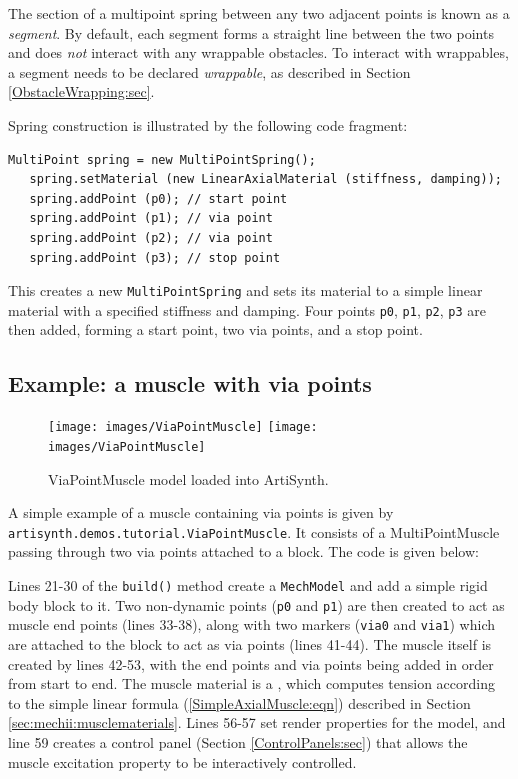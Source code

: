The section of a multipoint spring between any two adjacent points is
known as a {\it segment}. By default, each segment forms a straight
line between the two points and does {\it not} interact with any
wrappable obstacles. To interact with wrappables, a segment needs to
be declared {\it wrappable}, as described in
Section \ref{ObstacleWrapping:sec}.

Spring construction is illustrated by the following code fragment:
%
\begin{lstlisting}[]
   MultiPoint spring = new MultiPointSpring();
   spring.setMaterial (new LinearAxialMaterial (stiffness, damping));
   spring.addPoint (p0); // start point
   spring.addPoint (p1); // via point
   spring.addPoint (p2); // via point
   spring.addPoint (p3); // stop point
\end{lstlisting}
%
This creates a new {\tt MultiPointSpring} and sets its material to a
simple linear material with a specified stiffness and damping.  Four points
{\tt p0}, {\tt p1}, {\tt p2}, {\tt p3} are then added, forming a start
point, two via points, and a stop point.

\subsection{Example: a muscle with via points}
\label{ViaPointMuscle:sec}

\begin{figure}[t]
\begin{center}
\iflatexml
 \texttt{[image: images/ViaPointMuscle]}
\else
 \texttt{[image: images/ViaPointMuscle]}
\fi
\end{center}
\caption{ViaPointMuscle model loaded into ArtiSynth.}
\label{ViaPointMuscle:fig}
\end{figure}

A simple example of a muscle containing via points is given by 
{\tt artisynth.demos.tutorial.ViaPointMuscle}.  It consists
of a MultiPointMuscle passing through two via points attached to a
block. The code is given below:
\lstset{numbers=left}

\lstset{numbers=none}

Lines 21-30 of the {\tt build()} method create a {\tt MechModel} and
add a simple rigid body block to it. Two non-dynamic points ({\tt p0}
and {\tt p1}) are then created to act as muscle end points
(lines 33-38), along with two markers ({\tt via0} and {\tt via1})
which are attached to the block to act as via points
(lines 41-44). The muscle itself is created by lines 42-53, with the
end points and via points being added in order from start to end.
The muscle material is a 
,
which computes tension according to the simple linear formula 
(\ref{SimpleAxialMuscle:eqn}) described in Section 
\ref{sec:mechii:musclematerials}. Lines 56-57 set render
properties for the model, and line 59 creates a control panel
(Section \ref{ControlPanels:sec}) that allows the muscle {\sf
excitation} property to be interactively controlled.

